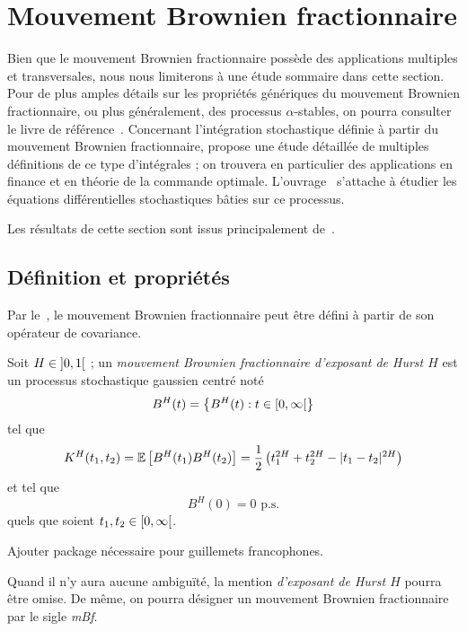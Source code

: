 \section{Mouvement Brownien fractionnaire}

Bien que le mouvement Brownien fractionnaire possède des applications
multiples et transversales, nous nous limiterons à une étude sommaire
dans cette section. Pour de plus amples détails sur les propriétés
génériques du mouvement Brownien fractionnaire, ou plus généralement,
des processus $\alpha$-stables, on pourra consulter le livre de
référence~\cite{samorodnitsky1994}. Concernant l'intégration
stochastique définie à partir du mouvement Brownien fractionnaire,
\cite{biagini2008} propose une étude détaillée de multiples
définitions de ce type d'intégrales ; on trouvera en particulier des
applications en finance et en théorie de la commande
optimale. L'ouvrage~\cite{mishura2008} s'attache à étudier les
équations différentielles stochastiques bâties sur ce processus.

Les résultats de cette section sont issus principalement
de~\cite{biagini2008,nourdin2012}.

\subsection{Définition et propriétés}
\label{subsec\string:fBm-def}

Par le~, le mouvement Brownien
fractionnaire peut être défini à partir de son opérateur de
covariance.

\begin{definition}
  \label{def\string:fBm}
  Soit $H\in\left]0,1\right[$ ; un \emph{mouvement Brownien fractionnaire
    d'exposant de Hurst $H$} est un processus stochastique gaussien
  centré noté
  \[ B^H(t) = \left\{B^H(t) : t \in \left[0,\infty\right[\right\} \] tel
  que
  \begin{align}
    \label{eqn\string:fBm-cov}
    K^H(t_1,t_2) = \mathbb{E}\left[B^H(t_1)B^H(t_2)\right] = \frac{1}{2}\left(t_1^{2H}+t_2^{2H}-|t_1-t_2|^{2H}\right)
  \end{align}
  et tel que \[ B^H(0) = 0 \text{ p.s.} \] quels que soient
  $t_1,t_2\in\left[0,\infty\right[$.
\end{definition}

\begin{alert}
  Ajouter package nécessaire pour guillemets francophones.
\end{alert}

\begin{notation}
  Quand il n'y aura aucune ambiguïté, la mention \emph{\og d'exposant
    de Hurst $H$\fg{}} pourra être omise. De même, on pourra désigner
  un mouvement Brownien fractionnaire par le sigle \emph{\og
    mBf\fg{}}.
\end{notation}

